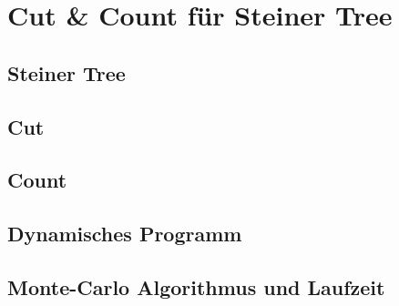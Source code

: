 %
%
%
\chapter{Cut \& Count für Steiner Tree}
\label{c:cc_steiner} %


\section{Steiner Tree}
\label{sec:steiner}

\section{Cut}
\label{sec:st_cut}

\section{Count}
\label{sec:st_count}

\section{Dynamisches Programm}
\label{sec:dynP}

\section{Monte-Carlo Algorithmus und Laufzeit}
\label{sec:mc_alg}
